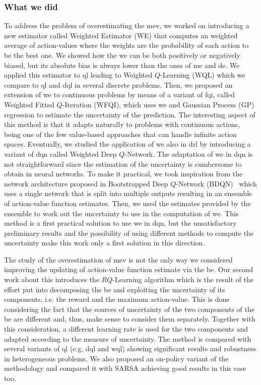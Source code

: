 \subsubsection{What we did}
To address the problem of overestimating the \gls{mev}, we worked on introducing a new estimator called Weighted Estimator (WE) that computes an weighted average of action-values where the weights are the probability of each action to be the best one. We showed how the \gls{we} can be both positively or negatively biased, but its absolute bias is always lower than the ones of \gls{me} and \gls{de}. We applied this estimator to \gls{ql} leading to Weighted $Q$-Learning (WQL) which we compare to \gls{ql} and \gls{dql} in several discrete problems. Then, we proposed an extension of \gls{we} to continuous problems by means of a variant of \gls{fqi}, called Weighted Fitted $Q$-Iteration (WFQI), which uses \gls{we} and Gaussian Process (GP) regression to estimate the uncertainty of the prediction. The interesting aspect of this method is that it adapts naturally to problems with continuous actions, being one of the few value-based approaches that can handle infinite action spaces. Eventually, we studied the application of \gls{we} also in \gls{drl} by introducing a variant of \gls{dqn} called Weighted Deep $Q$-Network. The adaptation of \gls{we} in \gls{dqn} is not straightforward since the estimation of the uncertainty is cumbersome to obtain in neural networks. To make it practical, we took inspiration from the network architecture proposed in Bootstrapped Deep $Q$-Network (BDQN)~\cite{osband2017deep} which uses a single network that is split into multiple outputs resulting in an ensemble of action-value function estimates. Then, we used the estimates provided by the ensemble to work out the uncertainty to use in the computation of \gls{we}. This method is a first practical solution to use \gls{we} in \gls{dqn}, but the unsatisfactory preliminary results and the possibility of using different methods to compute the uncertainty make this work only a first solution in this direction.

The study of the overestimation of \gls{mev} is not the only way we considered improving the updating of action-value function estimate via the \gls{be}. Our second work about this introduces the $RQ$-Learning algorithm which is the result of the effort put into decomposing the \gls{be} and exploiting the uncertainty of its components, i.e. the reward and the maximum action-value. This is done considering the fact that the sources of uncertainty of the two components of the \gls{be} are different and, thus, make sense to consider them separately. Together with this consideration, a different learning rate is used for the two components and adapted according to the measure of uncertainty. The method is compared with several variants of \gls{ql} (e.g. \gls{dql} and \gls{wql}) showing significant results and robustness in heterogeneous problems. We also proposed an on-policy variant of the methodology and compared it with SARSA achieving good results in this case too.

